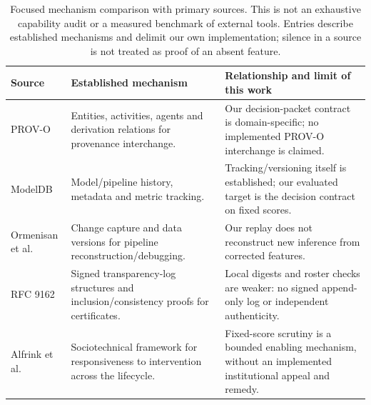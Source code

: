\begin{table}[t]
\centering\small
\caption{Focused mechanism comparison with primary sources. This is not an exhaustive capability audit or a measured benchmark of external tools. Entries describe established mechanisms and delimit our own implementation; silence in a source is not treated as proof of an absent feature.}
\label{tab:mechanism-positioning}
\begin{tabularx}{\textwidth}{p{}XX}
\toprule
Source & Established mechanism & Relationship and limit of this work \\
\midrule
PROV-O \cite{Lebo2013PROVO} & Entities, activities, agents and derivation relations for provenance interchange. & Our decision-packet contract is domain-specific; no implemented PROV-O interchange is claimed. \\
ModelDB \cite{Vartak2016ModelDB} & Model/pipeline history, metadata and metric tracking. & Tracking/versioning itself is established; our evaluated target is the decision contract on fixed scores. \\
Ormenisan et al. \cite{Ormenisan2020TimeTravel} & Change capture and data versions for pipeline reconstruction/debugging. & Our replay does not reconstruct new inference from corrected features. \\
RFC 9162 \cite{Laurie2021RFC9162} & Signed transparency-log structures and inclusion/consistency proofs for certificates. & Local digests and roster checks are weaker: no signed append-only log or independent authenticity. \\
Alfrink et al. \cite{Alfrink2023ContestableAI} & Sociotechnical framework for responsiveness to intervention across the lifecycle. & Fixed-score scrutiny is a bounded enabling mechanism, without an implemented institutional appeal and remedy. \\
\bottomrule
\end{tabularx}
\end{table}
